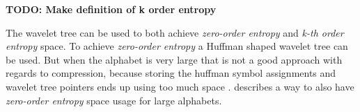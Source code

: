 \textbf{TODO: Make definition of k order entropy}

The wavelet tree can be used to both achieve \textit{zero-order entropy} and \textit{k-th order entropy} space. To achieve \textit{zero-order entropy} a Huffman shaped wavelet tree can be used. But when the alphabet is very large that is not a good approach with regards to compression, because storing the huffman symbol assignments and wavelet tree pointers ends up using too much space . \citep[Section~3]{Claude08practicalrankselect} describes a way to also have \textit{zero-order entropy} space usage for large alphabets. 






